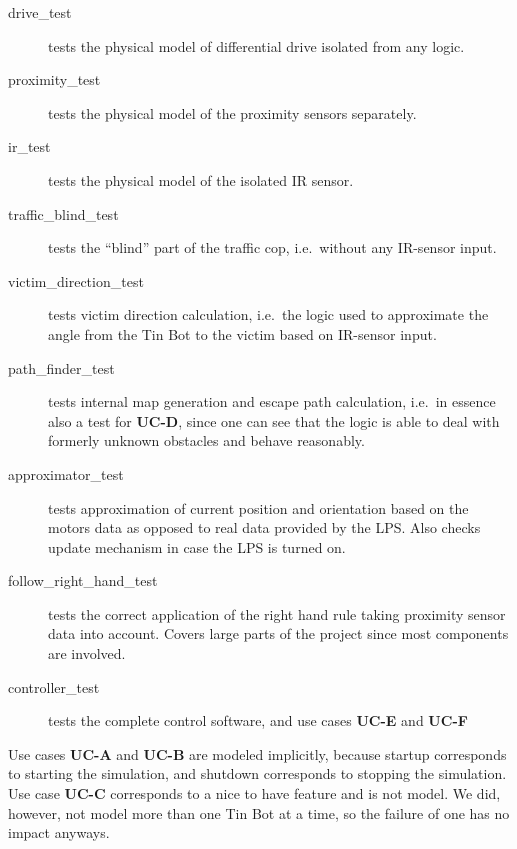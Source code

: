 \documentclass[a4paper,parskip,headheight=38pt]{scrartcl} %
\begin{document}
\begin{description}
\item[drive\_test] tests the physical model of differential drive isolated from any logic.
\item[proximity\_test] tests the physical model of the proximity sensors separately. %
\item[ir\_test] tests the physical model of the isolated IR sensor.
\item[traffic\_blind\_test] tests the \enquote{blind} part of the traffic cop, i.e.\ without any IR-sensor input.
\item[victim\_direction\_test] tests victim direction calculation, i.e.\ the logic used to approximate the angle from the Tin Bot to the victim based on IR-sensor input.
\item[path\_finder\_test] tests internal map generation and escape path calculation, i.e.\ in essence also a test for \textbf{UC-D}, since one can see that the logic is able to deal with formerly unknown obstacles and behave reasonably.
\item[approximator\_test] tests approximation of current position and orientation based on the motors data as opposed to real data provided by the LPS. Also checks update mechanism in case the LPS is turned on.
\item[follow\_right\_hand\_test] tests the correct application of the right hand rule taking proximity sensor data into account. Covers large parts of the project since most components are involved.
\item[controller\_test] tests the complete control software, and use cases \textbf{UC-E} and \textbf{UC-F}
\end{description}


Use cases \textbf{UC-A} and \textbf{UC-B} are modeled implicitly, because startup corresponds to starting the simulation, and shutdown corresponds to stopping the simulation.
Use case \textbf{UC-C} corresponds to a nice to have feature and is not model. We did, however, not model more than one Tin Bot at a time, so the failure of one has no impact anyways.
\end{document}

